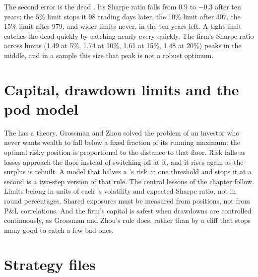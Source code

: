 The second error is the dead . Its Sharpe ratio falls from 0.9 to $-0.3$ after ten years; the 5\% limit stops it 98 trading days later, the 10\% limit
after 307, the 15\% limit after 979, and wider limits never, in the ten years left. A tight limit catches the dead  quickly by catching nearly every
 quickly. The firm's Sharpe ratio across limits (1.49 at 5\%, 1.74 at 10\%, 1.61 at 15\%, 1.48 at 20\%) peaks in the middle, and in a sample this size
that peak is not a robust optimum.

\section{Capital, drawdown limits and the pod model}

The  has a theory. Grossman and Zhou solved the problem of an investor who never wants wealth to fall below a fixed fraction of its
running maximum: the optimal risky position is proportional to the distance to that floor. Risk falls as losses approach the floor instead of switching
off at it, and it rises again as the surplus is rebuilt. A  model that halves a 's risk at one threshold and stops it at a second is a two-step
version of that rule. The central lessons of the chapter follow. Limits belong in units of each 's volatility and expected Sharpe ratio, not in
round percentages. Shared exposures must be measured from positions, not from P\&L correlations. And the firm's capital is safest when drawdowns are
controlled continuously, as Grossman and Zhou's rule does, rather than by a cliff that stops many good  to catch a few bad ones.

\section{Strategy files}

